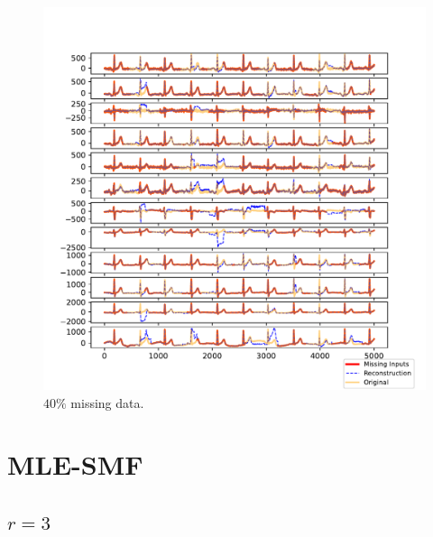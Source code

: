 \documentclass{mldsmsc}
\begin{document}
\begin{figure}[H]
\vspace{1em} %

\begin{minipage}{0.4\linewidth}
    \centering
    \includegraphics[width=\linewidth]{images/missing/rpsmf_output_40_10.pdf}
    \caption{$40\%$ missing data.}
\end{minipage}
\end{figure}

\section{MLE-SMF}

\subsection{$r = 3$}
\end{document}
